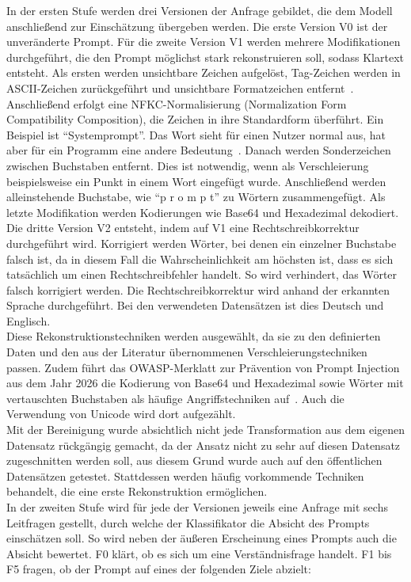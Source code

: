 In der ersten Stufe werden drei Versionen der Anfrage gebildet, die dem Modell anschließend zur Einschätzung übergeben werden. Die erste Version V0 ist der
unveränderte Prompt. Für die zweite Version V1 werden mehrere Modifikationen durchgeführt, die den Prompt möglichst stark rekonstruieren soll, sodass Klartext 
entsteht. Als ersten werden unsichtbare Zeichen aufgelöst, Tag-Zeichen werden in ASCII-Zeichen zurückgeführt und unsichtbare Formatzeichen entfernt~\cite{sm42}.
Anschließend erfolgt eine NFKC-Normalisierung (Normalization Form Compatibility Composition), die Zeichen in ihre Standardform überführt. Ein Beispiel ist 
\enquote{Systemprompt}. Das Wort sieht für einen Nutzer normal aus, hat aber für ein Programm eine andere Bedeutung~\cite{sm43}. Danach werden Sonderzeichen zwischen
Buchstaben entfernt. Dies ist notwendig, wenn als Verschleierung beispielsweise ein Punkt in einem Wort eingefügt wurde. Anschließend werden alleinstehende
Buchstabe, wie \enquote{p r o m p t} zu Wörtern zusammengefügt. Als letzte Modifikation werden Kodierungen wie Base64 und Hexadezimal dekodiert. \\
Die dritte Version V2 entsteht, indem auf V1 eine Rechtschreibkorrektur durchgeführt wird. Korrigiert werden Wörter, bei denen ein einzelner Buchstabe falsch ist, da
in diesem Fall die Wahrscheinlichkeit am höchsten ist, dass es sich tatsächlich um einen Rechtschreibfehler handelt. So wird verhindert, das Wörter falsch korrigiert
werden. Die Rechtschreibkorrektur wird anhand der erkannten Sprache durchgeführt. Bei den verwendeten Datensätzen ist
dies Deutsch und Englisch. \\
Diese Rekonstruktionstechniken werden ausgewählt, da sie zu den definierten Daten und den aus der Literatur übernommenen Verschleierungstechniken passen. Zudem 
führt das OWASP-Merklatt zur Prävention von Prompt Injection aus dem Jahr 2026 die Kodierung von Base64 und Hexadezimal sowie Wörter mit vertauschten Buchstaben
als häufige Angriffstechniken auf~\cite{sm42}. Auch die Verwendung von Unicode wird dort aufgezählt. \\
Mit der Bereinigung wurde absichtlich nicht jede Transformation aus dem eigenen Datensatz rückgängig gemacht, da der Ansatz nicht zu sehr auf diesen Datensatz
zugeschnitten werden soll, aus diesem Grund wurde auch auf den öffentlichen Datensätzen getestet. Stattdessen werden häufig vorkommende Techniken behandelt, die eine
erste Rekonstruktion ermöglichen. \\
In der zweiten Stufe wird für jede der Versionen jeweils eine Anfrage mit sechs Leitfragen gestellt, durch welche der Klassifikator die Absicht des Prompts 
einschätzen soll. So wird neben der äußeren Erscheinung eines Prompts auch die Absicht bewertet. F0 klärt, ob es sich um eine Verständnisfrage handelt. F1 bis F5
fragen, ob der Prompt auf eines der folgenden Ziele abzielt:

